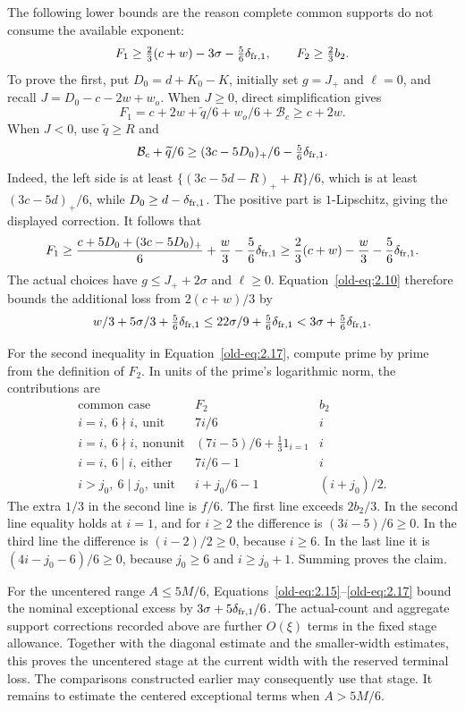 \documentclass[11pt,a4paper]{article}
\numberwithin{equation}{section}
\numberwithin{figure}{section}
\theoremstyle{definition}
\theoremstyle{remark}
\begin{document}
The following lower bounds are the reason complete common supports
do not consume the available exponent:
\begin{equation}
 F_1\ge\tfrac23(c+w)-3\sigma-\tfrac56\delta_{{\rm fr},1},\qquad
 F_2\ge\tfrac23b_2.
 \label{old-eq:2.17}
\end{equation}
To prove the first, put \(D_0=d+K_0-K\), initially set
\(g=J_+\) and \(\ell=0\), and recall
\(J=D_0-c-2w+w_o\).  When \(J\ge0\), direct simplification
gives
\[
 F_1=c+2w+\widetilde q/6+w_o/6+\mathcal B_c
       \ge c+2w.
\]
When \(J<0\), use \(\widetilde q\ge R\) and
\[
 \mathcal B_c+\widetilde q/6
 \ge (3c-5D_0)_+/6-\tfrac56\delta_{{\rm fr},1}.
\]
Indeed, the left side is at least
\(\{(3c-5d-R)_++R\}/6\), which is at least
\((3c-5d)_+/6\), while
\(D_0\ge d-\delta_{{\rm fr},1}\).  The positive part is
\(1\)-Lipschitz, giving the displayed correction.
It follows that
\[
 F_1\ge
 \frac{c+5D_0+(3c-5D_0)_+}{6}+\frac w3
       -\frac56\delta_{{\rm fr},1}
 \ge\frac23(c+w)-\frac w3-\frac56\delta_{{\rm fr},1}.
\]
The actual choices have \(g\le J_++2\sigma\) and
\(\ell\ge0\).  Equation~\eqref{old-eq:2.10} therefore bounds
the additional loss from \(2(c+w)/3\) by
\[
 w/3+5\sigma/3+\tfrac56\delta_{{\rm fr},1}
 \le22\sigma/9+\tfrac56\delta_{{\rm fr},1}
 <3\sigma+\tfrac56\delta_{{\rm fr},1}.
\]

For the second inequality in Equation~\eqref{old-eq:2.17}, compute
prime by prime from the definition of \(F_2\).  In units of the
prime's logarithmic norm, the contributions are
\[
 \begin{array}{c|c|c}
 \text{common case}&F_2&b_2\\ \hline
 i=i,\ 6\nmid i,\ \text{unit}&7i/6&i\\
 i=i,\ 6\nmid i,\ \text{nonunit}
       &(7i-5)/6+\tfrac13 1_{i=1}&i\\
 i=i,\ 6\mid i,\ \text{either}&7i/6-1&i\\
 i>j_0,\ 6\mid j_0,\ \text{unit}
       &i+j_0/6-1&(i+j_0)/2 .
 \end{array}
\]
The extra \(1/3\) in the second line is \(f/6\).  The first
line exceeds \(2b_2/3\).  In the second line equality holds at
\(i=1\), and for \(i\ge2\) the difference is
\((3i-5)/6\ge0\).  In the third line the difference is
\((i-2)/2\ge0\), because \(i\ge6\).  In the last line it is
\((4i-j_0-6)/6\ge0\), because \(j_0\ge6\) and
\(i\ge j_0+1\).  Summing proves the claim.

For the uncentered range \(A\le5M/6\),
Equations~\eqref{old-eq:2.15}--\eqref{old-eq:2.17}
bound the nominal exceptional excess by
\(3\sigma+5\delta_{{\rm fr},1}/6\).  The actual-count and aggregate
support corrections recorded above are further \(O(\xi)\) terms
in the fixed stage allowance.  Together with the
diagonal estimate and the smaller-width estimates, this proves the
uncentered stage at the current width with the reserved terminal
loss.  The comparisons constructed earlier may consequently use
that stage.  It remains to estimate the centered exceptional terms
when \(A>5M/6\).
\end{document}
